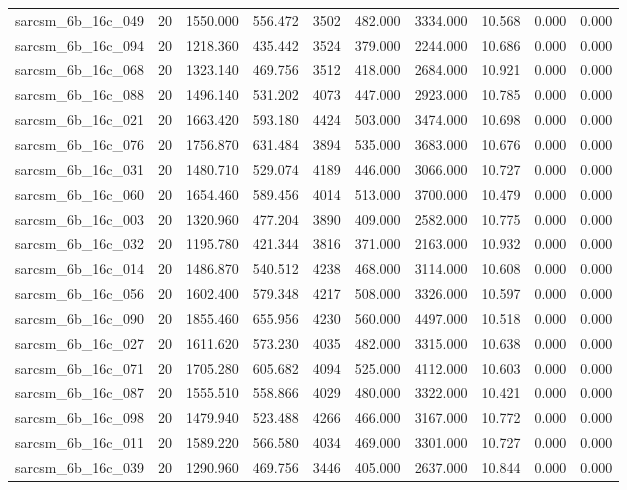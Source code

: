 \begin{tabular}{lrrrrrrrrr}
sarcsm\_6b\_16c\_049 & 20 & 1550.000 & 556.472 & 3502 & 482.000 & 3334.000 & 10.568 & 0.000 & 0.000 \\
sarcsm\_6b\_16c\_094 & 20 & 1218.360 & 435.442 & 3524 & 379.000 & 2244.000 & 10.686 & 0.000 & 0.000 \\
sarcsm\_6b\_16c\_068 & 20 & 1323.140 & 469.756 & 3512 & 418.000 & 2684.000 & 10.921 & 0.000 & 0.000 \\
sarcsm\_6b\_16c\_088 & 20 & 1496.140 & 531.202 & 4073 & 447.000 & 2923.000 & 10.785 & 0.000 & 0.000 \\
sarcsm\_6b\_16c\_021 & 20 & 1663.420 & 593.180 & 4424 & 503.000 & 3474.000 & 10.698 & 0.000 & 0.000 \\
sarcsm\_6b\_16c\_076 & 20 & 1756.870 & 631.484 & 3894 & 535.000 & 3683.000 & 10.676 & 0.000 & 0.000 \\
sarcsm\_6b\_16c\_031 & 20 & 1480.710 & 529.074 & 4189 & 446.000 & 3066.000 & 10.727 & 0.000 & 0.000 \\
sarcsm\_6b\_16c\_060 & 20 & 1654.460 & 589.456 & 4014 & 513.000 & 3700.000 & 10.479 & 0.000 & 0.000 \\
sarcsm\_6b\_16c\_003 & 20 & 1320.960 & 477.204 & 3890 & 409.000 & 2582.000 & 10.775 & 0.000 & 0.000 \\
sarcsm\_6b\_16c\_032 & 20 & 1195.780 & 421.344 & 3816 & 371.000 & 2163.000 & 10.932 & 0.000 & 0.000 \\
sarcsm\_6b\_16c\_014 & 20 & 1486.870 & 540.512 & 4238 & 468.000 & 3114.000 & 10.608 & 0.000 & 0.000 \\
sarcsm\_6b\_16c\_056 & 20 & 1602.400 & 579.348 & 4217 & 508.000 & 3326.000 & 10.597 & 0.000 & 0.000 \\
sarcsm\_6b\_16c\_090 & 20 & 1855.460 & 655.956 & 4230 & 560.000 & 4497.000 & 10.518 & 0.000 & 0.000 \\
sarcsm\_6b\_16c\_027 & 20 & 1611.620 & 573.230 & 4035 & 482.000 & 3315.000 & 10.638 & 0.000 & 0.000 \\
sarcsm\_6b\_16c\_071 & 20 & 1705.280 & 605.682 & 4094 & 525.000 & 4112.000 & 10.603 & 0.000 & 0.000 \\
sarcsm\_6b\_16c\_087 & 20 & 1555.510 & 558.866 & 4029 & 480.000 & 3322.000 & 10.421 & 0.000 & 0.000 \\
sarcsm\_6b\_16c\_098 & 20 & 1479.940 & 523.488 & 4266 & 466.000 & 3167.000 & 10.772 & 0.000 & 0.000 \\
sarcsm\_6b\_16c\_011 & 20 & 1589.220 & 566.580 & 4034 & 469.000 & 3301.000 & 10.727 & 0.000 & 0.000 \\
sarcsm\_6b\_16c\_039 & 20 & 1290.960 & 469.756 & 3446 & 405.000 & 2637.000 & 10.844 & 0.000 & 0.000 \\

\end{tabular}
